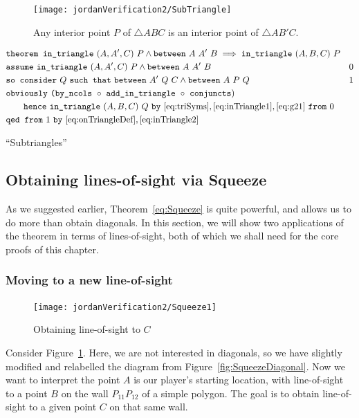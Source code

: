\begin{figure}
\centering\texttt{[image: jordanVerification2/SubTriangle]}
\caption{Any interior point $P$ of $\triangle ABC$ is an interior point of $\triangle AB'C$.}
\end{figure}

\begin{boxedfigure}
\small
\begin{align*}
&\code{theorem }\code{in\_triangle}\ (A,A',C)\ P \wedge \between{A}{A'}{B} 
                  \implies \code{in\_triangle}\ (A,B,C)\ P\\
&\code{assume}\ \code{in\_triangle}\ (A,A',C)\ P \wedge \between{A}{A'}{B} & 0 \\
&\code{so consider}\ Q\ \code{such that}\ \between{A'}{Q}{C} \wedge \between{A}{P}{Q} & 1\\
&\code{obviously}\ \code{(by\_ncols}\ \circ\ \code{add\_in\_triangle}\ \circ\ \code{conjuncts})\\
&\qquad \code{hence}\ \code{in\_triangle}\ (A,B,C)\ Q\ \code{by}\ \eqref{eq:triSyms},\eqref{eq:inTriangle1},\eqref{eq:g21}\ \code{from}\ 0\\
&\code{qed from}\ 1\ \code{by}\ \eqref{eq:onTriangleDef},\eqref{eq:inTriangle2}
\end{align*}
\caption{``Subtriangles''}
\label{fig:SubTriangle}
\end{boxedfigure}

\subsection{Obtaining lines-of-sight via Squeeze}\label{sec:SqueezeEye}
As we suggested earlier, Theorem~\ref{eq:Squeeze} is quite powerful, and allows us to do more than obtain diagonals. In this section, we will show two applications of the theorem in terms of lines-of-sight, both of which we shall need for the core proofs of this chapter. 

\subsubsection{Moving to a new line-of-sight}\label{sec:MoveToNew}
\begin{figure}
\centering\texttt{[image: jordanVerification2/Squeeze1]}
\caption{Obtaining line-of-sight to $C$}
\label{fig:Squeeze1}
\end{figure}

Consider Figure~\ref{fig:Squeeze1}. Here, we are not interested in diagonals, so we have slightly modified and relabelled the diagram from Figure~\ref{fig:SqueezeDiagonal}. Now we want to interpret the point $A$ is our player's starting location, with line-of-sight to a point $B$ on the wall $P_{11}P_{12}$ of a simple polygon. The goal is to obtain line-of-sight to a given point $C$ on that same wall.

